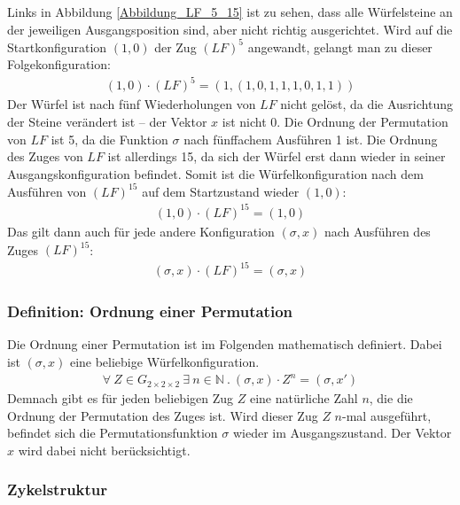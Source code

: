 \documentclass[12pt,a4paper, usenames, dvipsnames]{article}
\theoremstyle{mystyle}
\theoremstyle{definition}
\newcommand{\Gtwo}{\ensuremath{G_{2\times 2\times 2}}}
\begin{document}
Links in Abbildung \ref{Abbildung_LF_5_15} ist zu sehen, dass alle Würfelsteine an der jeweiligen Ausgangsposition sind, aber nicht richtig ausgerichtet. Wird auf die Startkonfiguration $(1,0)$ der Zug $(LF)^5$ angewandt, gelangt man zu dieser Folgekonfiguration:
\begin{align*}
(1,0) \cdot (LF)^5 = (1, (1,0,1,1,1,0,1,1))
\end{align*}
Der Würfel ist nach fünf Wiederholungen von $LF$ nicht gelöst, da die Ausrichtung der Steine verändert ist -- der Vektor $x$ ist nicht 0. Die Ordnung der Permutation von $LF$ ist 5, da die Funktion $\sigma$ nach fünffachem Ausführen 1 ist. Die Ordnung des Zuges von $LF$ ist allerdings 15, da sich der Würfel erst dann wieder in seiner Ausgangskonfiguration befindet. Somit ist die Würfelkonfiguration nach dem Ausführen von $(LF)^{15}$ auf dem Startzustand wieder $(1,0)$:
\begin{align*}
(1,0) \cdot (LF)^{15} = (1,0)
\end{align*}
Das gilt dann auch für jede andere Konfiguration $(\sigma, x)$ nach Ausführen des Zuges $(LF)^{15}$:
\begin{align*}
(\sigma, x) \cdot (LF)^{15} = (\sigma, x)
\end{align*}

\subsubsection*{Definition: Ordnung einer Permutation}

Die Ordnung einer Permutation ist im Folgenden mathematisch definiert. Dabei ist $(\sigma, x)$ eine beliebige Würfelkonfiguration.
\begin{align*}
\forall \ Z \in \Gtwo \ \exists \ n \in \mathbb{N} \ . \ (\sigma, x) \cdot Z^n = (\sigma, x')
\end{align*}
Demnach gibt es für jeden beliebigen Zug $Z$ eine natürliche Zahl $n$, die die Ordnung der Permutation des Zuges ist. Wird dieser Zug $Z$ $n$-mal ausgeführt, befindet sich die Permutationsfunktion $\sigma$ wieder im Ausgangszustand. Der Vektor $x$ wird dabei nicht berücksichtigt.




\subsubsection*{Zykelstruktur}



\label{Abschnitt_Zykelstruktur}
\end{document}
